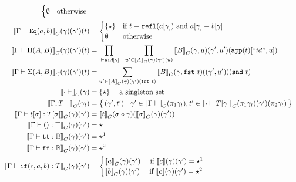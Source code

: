 \begin{align*}
\begin{cases}
      \emptyset & \text{otherwise }
    \end{cases}\\
  \denotesC{\goodType{\Gm}{\TyId{a}{b}}{}}(\gm)(\gm')(t) &= 
  \begin{cases}
    \{\star\} & \text{if } t \equiv \eqrefl{\sub{a}{\gm}} \text{ and } \sub{a}{\gm} \equiv \sub{b}{\gm}\\
    \emptyset & \text{otherwise }
  \end{cases}\\
  \denotesC{\goodType{\Gm}{\TyPi{A}{B}}{}}(\gm)(\gm')(t) &= \prod_{\goodTerm{\cdot}{u}{\sub{A}{\gm}}} \ \ \prod_{u' \in \denotesC{A}(\gm)(\gm')(u)} \denotesC{B}(\SubstExt{\gm}{u})(\gm', u')(\sub{\app{t}}{\SubstExt{"id"}{u}})\\
  \denotesC{\goodType{\Gm}{\TySigma{A}{B}}{}}(\gm)(\gm')(t) &= \sum_{u' \in \denotesC{A}(\gm)(\gm')(\fst{t})} \denotesC{B}(\SubstExt{\gm}{\fst{t}})((\gm', u'))(\snd{t}) \\
  \denotesC{\goodCtx{\cdot}{}}(\gm) &= \{\star\} \quad \text{  a singleton set } \\ 
  \denotesC{\goodCtx{\Gm, T}{}}(\gm_t) &= \setc{ (\gamma' , t') }{ \gm' \in \denotesC{\goodCtx{\Gm}{}}(\pi_1 \gm_t), t' \in \denotesC{\goodType{\cdot}{\sub{T}{\gm}}{}}(\pi_1 \gm_t)(\gm')(\pi_2 \gm_t)  } \\
  \denotesC{\goodTerm{\Gm}{\sub{t}{\sigma}}{\sub{T}{\sigma}}}(\gm)(\gm') &= \denotesC{t}(\sigma \circ \gm)(\denotesC{\sigma}(\gm)(\gm')) \\
  \denotesC{\goodTerm{\Gm}{\unit}{\top}}(\gm)(\gm') &= \star\\
  \denotesC{\goodTerm{\Gm}{\true}{\cB}}(\gm)(\gm') &= \star^1 \\
  \denotesC{\goodTerm{\Gm}{\false}{\cB}}(\gm)(\gm') &= \star^2 \\
  \denotesC{\goodTerm{\Gm}{\ifb{c}{a}{b}}{T}}(\gm)(\gm') &= 
  \begin{cases}
    \denotesC{a}(\gm)(\gm') \quad \text{ if } \denotes{c}(\gm)(\gm') = \star^1 \\
    \denotesC{b}(\gm)(\gm') \quad \text{ if } \denotes{c}(\gm)(\gm') = \star^2
  \end{cases}\\

\end{align*}

